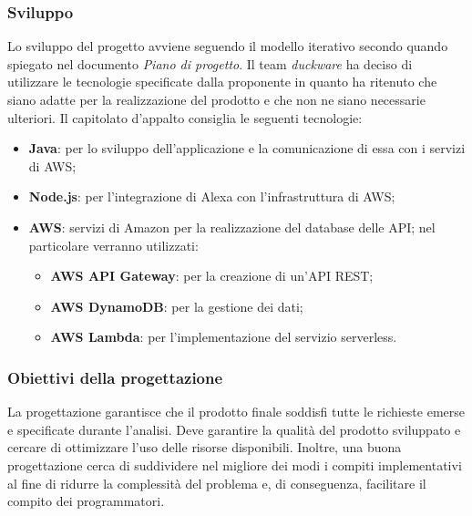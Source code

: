 \subsubsection{Sviluppo}
Lo sviluppo del progetto avviene seguendo il modello iterativo secondo quando spiegato nel documento \textit{Piano di progetto}. Il team \textit{duckware} ha deciso di utilizzare le tecnologie specificate dalla proponente in quanto ha ritenuto che siano adatte per la realizzazione del prodotto e che non ne siano necessarie ulteriori. Il capitolato d'appalto consiglia le seguenti tecnologie:
\begin{itemize}
    \item \textbf{Java}: per lo sviluppo dell'applicazione e la comunicazione di essa con i servizi di AWS;
    \item \textbf{Node.js}: per l'integrazione di Alexa con l'infrastruttura di AWS;
    \item \textbf{AWS}: servizi di Amazon per la realizzazione del database delle API; nel particolare verranno utilizzati: 
    \begin{itemize}
        \item \textbf{AWS API Gateway}: per la creazione di un'API REST;
        \item \textbf{AWS DynamoDB}: per la gestione dei dati;
        \item \textbf{AWS Lambda}: per l'implementazione del servizio serverless.
    \end{itemize}
\end{itemize}
\subsubsection{Obiettivi della progettazione}
La progettazione garantisce che il prodotto finale soddisfi tutte le richieste emerse e specificate durante l’analisi. Deve garantire la qualità del prodotto sviluppato e cercare di ottimizzare l’uso delle risorse disponibili. Inoltre, una buona progettazione cerca di suddividere nel migliore dei modi i compiti implementativi al fine di ridurre la complessità del problema e, di conseguenza, facilitare il compito dei programmatori.
